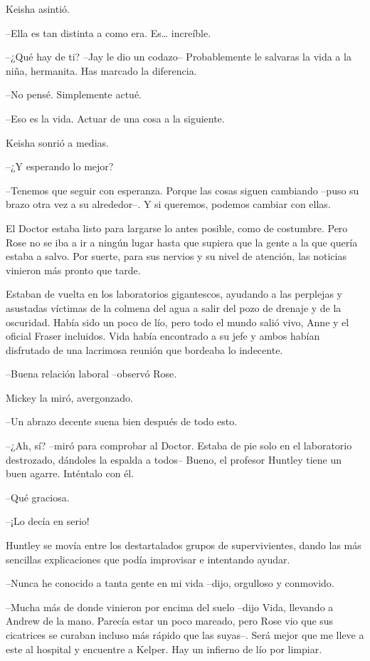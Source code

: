 {Keisha asintió.}

{--Ella es tan distinta a como era. Es\ldots{} increíble.}

{--¿Qué hay de ti? --Jay le dio un codazo-- Probablemente le salvaras la
vida a la niña, hermanita. Has marcado la diferencia.}

{--No pensé. Simplemente actué.}

{--Eso es la vida. Actuar de una cosa a la siguiente.}

{Keisha sonrió a medias.}

{--¿Y esperando lo mejor?}

{--Tenemos que seguir con esperanza. Porque las cosas siguen cambiando
 --puso su brazo otra vez a su alrededor--. Y si queremos, podemos
cambiar con ellas.}

\mbox{}

{El Doctor estaba listo para largarse lo antes posible, como de
 costumbre. Pero Rose no se iba a ir a ningún lugar hasta que supiera que
 la gente a la que quería estaba a salvo. Por suerte, para sus nervios y
su nivel de atención, las noticias vinieron más pronto que tarde.}

{Estaban de vuelta en los laboratorios gigantescos, ayudando a las
 perplejas y asustadas víctimas de la colmena del agua a salir del pozo
 de drenaje y de la oscuridad. Había sido un poco de lío, pero todo el
 mundo salió vivo, Anne y el oficial Fraser incluidos. Vida había
 encontrado a su jefe y ambos habían disfrutado de una lacrimosa reunión
que bordeaba lo indecente.}

{--Buena relación laboral --observó Rose.}

{Mickey la miró, avergonzado.}

{--Un abrazo decente suena bien después de todo esto.}

{--¿Ah, sí? --miró para comprobar al Doctor. Estaba de pie solo en el
 laboratorio destrozado, dándoles la espalda a todos-- Bueno, el profesor
Huntley tiene un buen agarre. Inténtalo con él.}

{--Qué graciosa.}

{--¡Lo decía en serio!}

{Huntley se movía entre los destartalados grupos de supervivientes,
 dando las más sencillas explicaciones que podía improvisar e intentando
ayudar.}

{--Nunca he conocido a tanta gente en mi vida --dijo, orgulloso y
conmovido.}

{--Mucha más de donde vinieron por encima del suelo --dijo Vida,
 llevando a Andrew de la mano. Parecía estar un poco mareado, pero Rose
 vio que sus cicatrices se curaban incluso más rápido que las suyas--.
 Será mejor que me lleve a este al hospital y encuentre a Kelper. Hay un
infierno de lío por limpiar.}

